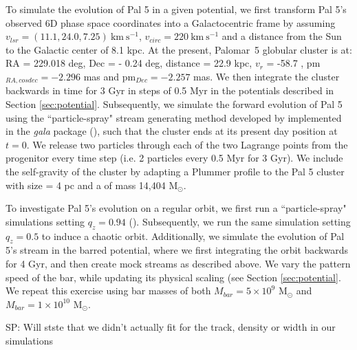 \documentclass[twocolumn]{aastex62}
\newcommand{\package}[1]{\textsl{#1}}
\newcommand{\msun}{\textrm{M}_\odot}
\newcommand{\kms}{\ensuremath{\textrm{km}~\textrm{s}^{-1}}}
\newcommand{\sa}[1]{{\color{magenta} SP: #1}}
\begin{document}
To simulate the evolution of Pal 5 in a given potential, we first transform Pal 5's observed 6D phase space coordinates into a Galactocentric frame by assuming $v_{lsr} = (11.1, 24.0, 7.25) ~\kms$,  $v_{circ} = 220  ~\kms$ and a distance from the Sun to the Galactic center of 8.1 kpc.
At the present, Palomar~5 globular cluster is at: RA = 229.018 deg, Dec = - 0.24 deg, distance = 22.9 kpc, $v_r$ = -58.7 , pm$_{RA,cosdec}= -2.296$ mas and pm$_{Dec} = -2.257$ mas.
We then integrate the cluster backwards in time for 3 Gyr in steps of 0.5 Myr in the potentials described in Section \ref{sec:potential}.
Subsequently, we simulate the forward evolution of Pal 5 using the ``particle-spray" stream generating method developed by \citet{Fardal:2015} implemented in the \package{gala} package (\citealt{gala}), such that the cluster ends at its present day position at $t = 0$. We release two particles through each of the two Lagrange points from the progenitor every time step (i.e. 2 particles every 0.5 Myr for 3 Gyr). We include the self-gravity of the cluster by adapting a Plummer profile to the Pal 5 cluster with size = 4 pc and a of mass 14,404 M$_{\odot}$. 

To investigate Pal 5's evolution on a regular orbit, we first run a ``particle-spray" simulations setting $q_z = 0.94$ (\citealt{Bovy:2016}).
Subsequently, we run the same simulation setting $q_z = 0.5$ to induce a chaotic orbit.
Additionally, we simulate the evolution of Pal 5's stream in the barred potential, where we first integrating the orbit backwards for 4 Gyr, and then create mock streams as described above.
We vary the pattern speed of the bar, while updating its physical scaling (see Section \ref{sec:potential}. %
We repeat this exercise using bar masses of both $M_{bar} = 5 \times 10^{9}$ $\msun$ and $M_{bar} = 1 \times 10^{10}$ $\msun$.

\sa{Will stste that we didn't actually fit for the track, density or width in our simulations} 
\end{document}

